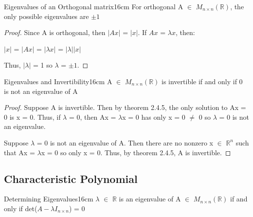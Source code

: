     \vspace{0.5cm}



    \begin{wtheorem}{Eigenvalues of an Orthogonal matrix}{16cm}
        For orthogonal A $\in$ $M_{n \times n}(\mathbb{R})$,
        the only possible eigenvalues are $\pm 1$
    \end{wtheorem}

    \begin{proof}
        Since A is orthogonal, then $|Ax|$ = $|x|$.
        If $Ax$ = $\lambda x$, then:
        
        \hspace{0.5cm}
        $|x|$ = $|Ax|$ = $|\lambda x|$ = $|\lambda| |x|$

        Thus, $|\lambda|$ = 1 so $\lambda$ = $\pm 1$.
    \end{proof}

    \vspace{0.5cm}



    \begin{wtheorem}{Eigenvalues and Invertibility}{16cm}
        A $\in$ $M_{n \times n}(\mathbb{R})$ is invertible if and only if
        0 is not an eigenvalue of A
    \end{wtheorem}

    \begin{proof}
        Suppose A is invertible.
        Then by {\color{red} theorem 2.4.5}, the only solution to Ax = 0 is x = 0.
        Thus, if $\lambda$ = 0, then Ax = $\lambda$x = 0 has only x = 0 $\not =$ 0
        so $\lambda$ = 0 is not an eigenvalue.

        \vspace{0.3cm}

        Suppose $\lambda$ = 0 is not an eigenvalue of A.
        Then there are no nonzero x $\in$ $\mathbb{R}^n$
        such that Ax = $\lambda$x = 0 so only x = 0.
        Thus, by {\color{red} theorem 2.4.5}, A is invertible.
    \end{proof}

    \newpage





\subsection{ Characteristic Polynomial }

    \begin{wtheorem}{Determining Eigenvalues}{16cm}
        $\lambda$ $\in$ $\mathbb{R}$ is an eigenvalue of
        A $\in$ $M_{n \times n}(\mathbb{R})$ if and only if
        det($A - \lambda I_{n \times n}$) = 0
    \end{wtheorem}

